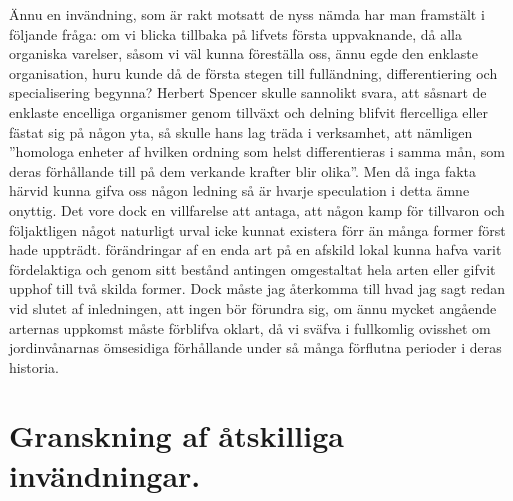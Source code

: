 Ännu en invändning, som är rakt motsatt de nyss nämda har man framstält i följande fråga: om vi blicka tillbaka på lifvets första uppvaknande, då alla organiska varelser, såsom vi väl kunna föreställa oss, ännu egde den enklaste organisation, huru kunde då de första stegen till fulländning, differentiering och specialisering begynna? Herbert Spencer skulle sannolikt svara, att såsnart de enklaste encelliga organismer genom tillväxt och delning blifvit flercelliga eller fästat sig på någon yta, så skulle hans lag träda i verksamhet, att nämligen ”homologa enheter af hvilken ordning som helst differentieras i samma mån, som deras förhållande till på dem verkande krafter blir olika”. Men då inga fakta härvid kunna gifva oss någon ledning så är hvarje speculation i detta ämne onyttig. Det vore dock en villfarelse att antaga, att någon kamp för tillvaron och följaktligen något naturligt urval icke kunnat existera förr än många former först hade uppträdt. förändringar af en enda art på en afskild lokal kunna hafva varit fördelaktiga och genom sitt bestånd antingen omgestaltat hela arten eller gifvit upphof till två skilda former. Dock måste jag återkomma till hvad jag sagt redan vid slutet af inledningen, att ingen bör förundra sig, om ännu mycket angående arternas uppkomst måste förblifva oklart, då vi sväfva i fullkomlig ovisshet om jordinvånarnas ömsesidiga förhållande under så många förflutna perioder i deras historia.



\section{Granskning af åtskilliga invändningar.}

